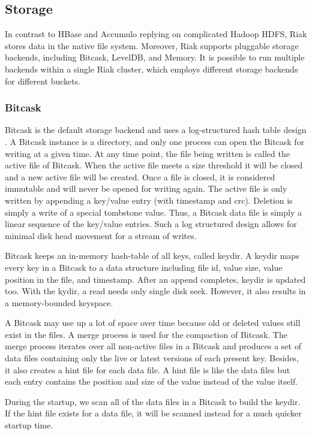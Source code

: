 \documentclass[12pt]{book}
\begin{document}
\subsection{Storage}

In contrast to HBase and Accumulo replying on complicated Hadoop HDFS, Riak stores data in the native file system. Moreover, Riak supports pluggable storage backends, including Bitcask, LevelDB, and Memory. It is possible to run multiple backends within a single Riak cluster, which employs different storage backends for different buckets. 

\subsubsection{Bitcask}
Bitcask is the default storage backend and uses a log-structured hash table design \cite{Bitcask}. A Bitcask instance is a directory, and only one process can open the Bitcask for writing at a given time. At any time point, the file being written is called the active file of Bitcask. When the active file meets a size threshold it will be closed and a new active file will be created. Once a file is closed, it is considered immutable and will never be opened for writing again. The active file is only written by appending a key/value entry (with timestamp and crc). Deletion is simply a write of a special tombstone value. Thus, a Bitcask data file is simply a linear sequence of the key/value entries. Such a log structured design allows for minimal disk head movement for a stream of writes.

Bitcask keeps an in-memory hash-table of all keys, called keydir. A keydir maps every key in a Bitcask to a data structure including file id, value size, value position in the file, and timestamp. After an append completes, keydir is updated too.
With the kydir, a read needs only single disk seek. However, it also results in a memory-bounded keyspace.

A Bitcask may use up a lot of space over time because old or deleted values still exist in the files. A merge process is used for the compaction of Bitcask. The merge process iterates over all non-active files in a Bitcask and produces a set of data files containing only the live or latest versions of each present key. Besides, it also creates a hint file for each data file. A hint file is like the data files but each entry contains the position and size of the value instead of the value itself.

During the startup, we scan all of the data files in a Bitcask to build the keydir. If the hint file exists for a data file, it will be scanned instead for a much quicker startup time.
\end{document}

